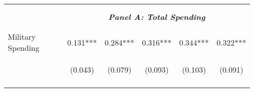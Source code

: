 \begin{tabular}{lccccc}
    \vspace{-2pt} & \vspace{-2pt} & \vspace{-2pt} & \vspace{-2pt} & \vspace{-2pt} \\\hline
    \vspace{-1.5pt} & \vspace{-1.5pt} & \vspace{-1.5pt} & \vspace{-1.5pt} & \vspace{-1.5pt} \\
    \cmidrule{2-6}
    \vspace{-1.5pt} & \vspace{-1.5pt} & \vspace{-1.5pt} & \vspace{-1.5pt} & \vspace{-1.5pt} \\
    & \multicolumn{5}{c}{\textit{\textbf{Panel A: Total Spending}}} \\ 
    \vspace{-1.5pt} & \vspace{-1.5pt} & \vspace{-1.5pt} & \vspace{-1.5pt} & \vspace{-1.5pt} \\ 
    \cmidrule{2-6}
    \vspace{-1.5pt} & \vspace{-1.5pt} & \vspace{-1.5pt} & \vspace{-1.5pt} & \vspace{-1.5pt}\\
    Military Spending & 0.131*** & 0.284*** & 0.316*** & 0.344*** & 0.322*** \\
    & \begin{footnotesize}(0.043)\end{footnotesize} & \begin{footnotesize}(0.079)\end{footnotesize} & \begin{footnotesize}(0.093)\end{footnotesize} & \begin{footnotesize}(0.103)\end{footnotesize} & \begin{footnotesize}(0.091)\end{footnotesize} \\
    \vspace{-1.5pt} & \vspace{-1.5pt} & \vspace{-1.5pt} & \vspace{-1.5pt} & \vspace{-1.5pt} \\
    

\end{tabular}
